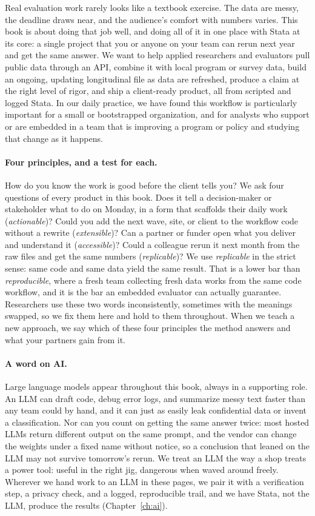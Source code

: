 \documentclass[
    a4paper,
    fontsize=10pt,
    twoside=true,
    numbers=noenddot,
]{kaobook}
\begin{document}
Real evaluation work rarely looks like a textbook exercise. The data are messy, the deadline draws near, and the audience's comfort with numbers varies. This book is about doing that job well, and doing all of it in one place with Stata at its core: a single project that you or anyone on your team can rerun next year and get the same answer. We want to help applied researchers and evaluators pull public data through an API, combine it with local program or survey data, build an ongoing, updating longitudinal file as data are refreshed, produce a claim at the right level of rigor, and ship a client-ready product, all from scripted and logged Stata. In our daily practice, we have found this workflow is particularly important for a small or bootstrapped organization, and for analysts who support or are embedded in a team that is improving a program or policy and studying that change as it happens.


\paragraph{Four principles, and a test for each.} How do you know the work is good before the client tells you? We ask four questions of every product in this book. Does it tell a decision-maker or stakeholder what to do on Monday, in a form that scaffolds their daily work (\emph{actionable})? Could you add the next wave, site, or client to the workflow code without a rewrite (\emph{extensible})? Can a partner or funder open what you deliver and understand it (\emph{accessible})? Could a colleague rerun it next month from the raw files and get the same numbers (\emph{replicable})? We use \emph{replicable} in the strict sense: same code and same data yield the same result. That is a lower bar than \emph{reproducible}, where a fresh team collecting fresh data works from the same code workflow, and it is the bar an embedded evaluator can actually guarantee. Researchers use these two words inconsistently, sometimes with the meanings swapped, so we fix them here and hold to them throughout. When we teach a new approach, we say which of these four principles the method answers and what your partners gain from it.

\paragraph{A word on AI.} Large language models appear throughout this book, always in a supporting role. An LLM can draft code, debug error logs, and summarize messy text faster than any team could by hand, and it can just as easily leak confidential data or invent a classification. Nor can you count on getting the same answer twice: most hosted LLMs return different output on the same prompt, and the vendor can change the weights under a fixed name without notice, so a conclusion that leaned on the LLM may not survive tomorrow's rerun. We treat an LLM the way a shop treats a power tool: useful in the right jig, dangerous when waved around freely. Wherever we hand work to an LLM in these pages, we pair it with a verification step, a privacy check, and a logged, reproducible trail, and we have Stata, not the LLM, produce the results (Chapter~\ref{ch:ai}).
\end{document}
